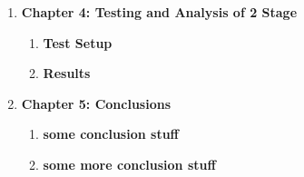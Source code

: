 \begin{enumerate}
	\item \textbf{Chapter 4: Testing and Analysis of 2 Stage}
	\begin{enumerate}
		\item \textbf{Test Setup}
		\item \textbf{Results}
	\end{enumerate}

	\item \textbf{Chapter 5: Conclusions}
	\begin{enumerate}
		\item \textbf{some conclusion stuff}
		\item \textbf{some more conclusion stuff}
	\end{enumerate}
\end{enumerate}